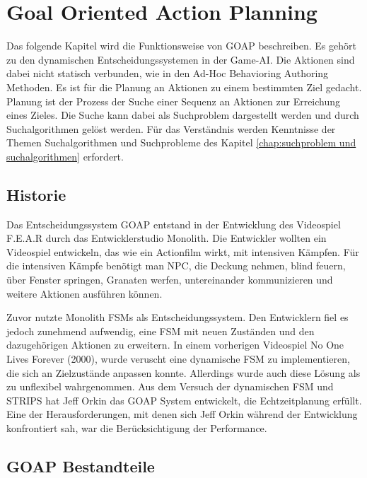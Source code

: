 \chapter{Goal Oriented Action Planning}
\label{chap:goap}

Das folgende Kapitel wird die Funktionsweise von GOAP beschreiben. Es geh\"{o}rt zu den dynamischen Entscheidungssystemen in der Game-AI. Die Aktionen sind dabei nicht statisch verbunden, wie in den Ad-Hoc Behavioring Authoring Methoden. Es ist f\"{u}r die Planung an Aktionen zu einem bestimmten Ziel gedacht. Planung ist der Prozess der Suche einer Sequenz an Aktionen zur Erreichung eines Zieles. Die Suche kann dabei als Suchproblem dargestellt werden und durch Suchalgorithmen gel\"{o}st werden. F\"{u}r das Verst\"{a}ndnis werden Kenntnisse der Themen Suchalgorithmen und Suchprobleme des Kapitel \ref{chap:suchproblem und suchalgorithmen} erfordert.

\section{Historie}
\label{chap:goap historie}

Das Entscheidungssystem GOAP entstand in der Entwicklung des Videospiel F.E.A.R durch das Entwicklerstudio Monolith. Die Entwickler wollten ein Videospiel entwickeln, das wie ein Actionfilm wirkt, mit intensiven K\"{a}mpfen. F\"{u}r die intensiven K\"{a}mpfe ben\"{o}tigt man NPC, die Deckung nehmen, blind feuern, \"{u}ber Fenster springen, Granaten werfen, untereinander kommunizieren und weitere Aktionen ausf\"{u}hren k\"{o}nnen.\autocite{fear}

Zuvor nutzte Monolith FSMs als Entscheidungssystem. Den Entwicklern fiel es jedoch zunehmend aufwendig, eine FSM mit neuen Zust\"{a}nden und den dazugeh\"{o}rigen Aktionen zu erweitern. In einem vorherigen Videospiel No One Lives Forever (2000), wurde veruscht eine dynamische FSM zu implementieren, die sich an Zielzust\"{a}nde anpassen konnte. Allerdings wurde auch diese L\"{o}sung als zu unflexibel wahrgenommen. Aus dem Versuch der dynamischen FSM und STRIPS hat Jeff Orkin das GOAP System entwickelt, die Echtzeitplanung erf\"{u}llt. Eine der Herausforderungen, mit denen sich Jeff Orkin w\"{a}hrend der Entwicklung konfrontiert sah, war die Ber\"{u}cksichtigung der Performance. \autocite{retro_fear}



\section{GOAP Bestandteile}
\label{chap:goap bestandteile}

